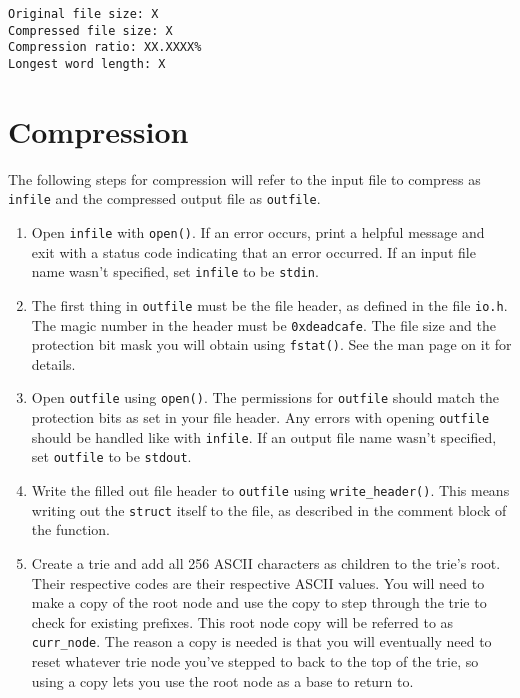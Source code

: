 \documentclass{article}
\begin{document}
\begin{lstlisting}
Original file size: X
Compressed file size: X
Compression ratio: XX.XXXX%
Longest word length: X
\end{lstlisting}

\section{Compression}
The following steps for compression will refer to the input file to compress as
\texttt{infile} and the compressed output file as \texttt{outfile}.

\begin{enumerate}
    \item Open \texttt{infile} with \texttt{open()}. If an error occurs, print a
        helpful message and exit with a status code indicating that an error
        occurred. If an input file name wasn't specified, set \texttt{infile} to
        be \texttt{stdin}.
    \item The first thing in \texttt{outfile} must be the file header, as
        defined in the file \texttt{io.h}. The magic number in the header must
        be \texttt{0xdeadcafe}. The file size and the protection bit mask you
        will obtain using \texttt{fstat()}. See the man page on it for details.
    \item Open \texttt{outfile} using \texttt{open()}. The permissions for
        \texttt{outfile} should match the protection bits as set in your file
        header. Any errors with opening \texttt{outfile} should be handled like
        with \texttt{infile}. If an output file name wasn't specified, set
        \texttt{outfile} to be \texttt{stdout}.
    \item Write the filled out file header to \texttt{outfile} using
        \texttt{write\_header()}. This means writing out the \texttt{struct}
        itself to the file, as described in the comment block of the function.
    \item Create a trie and add all 256 ASCII characters as children
        to the trie's root. Their respective codes are their respective
        ASCII values. You will need to make a copy of the root node and use the
        copy to step through the trie to check for existing prefixes. This root
        node copy will be referred to as \texttt{curr\_node}. The reason a copy
        is needed is that you will eventually need to reset whatever trie node
        you've stepped to back to the top of the trie, so using a copy lets you
        use the root node as a base to return to.

\end{enumerate}
\end{document}
